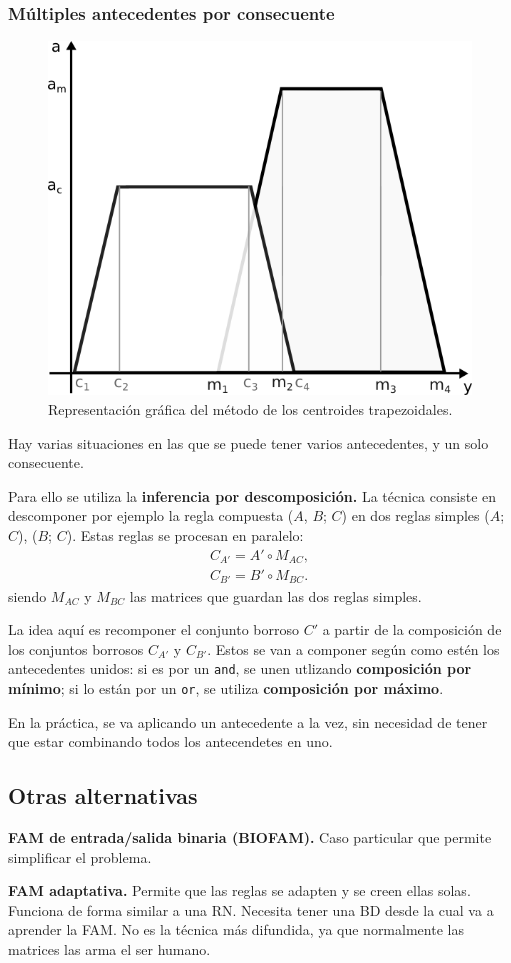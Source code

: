 \documentclass[10pt,a4paper]{article}
\begin{document}
\subsubsection{Múltiples antecedentes por consecuente}

\begin{figure}
  \caption{Representación gráfica del método de los centroides trapezoidales.}
  \label{fig:centroid}
  \centerline{\includegraphics[width=0.4\textwidth-\fboxrule-\fboxrule]{imgs/centroid.png}}
\end{figure}

Hay varias situaciones en las que se puede tener varios antecedentes, y un solo consecuente. 

Para ello se utiliza la \textbf{inferencia por descomposición.} La técnica consiste en descomponer por ejemplo la regla compuesta ($A$, $B$; $C$) en dos reglas simples ($A$; $C$), ($B$; $C$). Estas reglas se procesan en paralelo:
\begin{align*}
C_{A'} = A' \circ M_{AC}, \\
C_{B'} = B' \circ M_{BC}.
\end{align*}
siendo $M_{AC}$ y $M_{BC}$ las matrices que guardan las dos reglas simples. 

La idea aquí es recomponer el conjunto borroso $C'$ a partir de la composición de los conjuntos borrosos $C_{A'}$ y $C_{B'}$. Estos se van a componer según como estén los antecedentes unidos: si es por un \texttt{and}, se unen utlizando \textbf{composición por mínimo}; si lo están por un \texttt{or}, se utiliza \textbf{composición por máximo}.

En la práctica, se va aplicando un antecedente a la vez, sin necesidad de tener que estar combinando todos los antecendetes en uno.

\subsection{Otras alternativas}

\begin{description}
\item \textbf{FAM de entrada/salida binaria (BIOFAM).}  Caso particular que permite simplificar el problema.
\item \textbf{FAM adaptativa.} Permite que las reglas se adapten y se creen ellas solas. Funciona de forma similar a una RN. Necesita tener una BD desde la cual va a aprender la FAM. No es la técnica más difundida, ya que normalmente las matrices las arma el ser humano.
\end{description}
\end{document}
